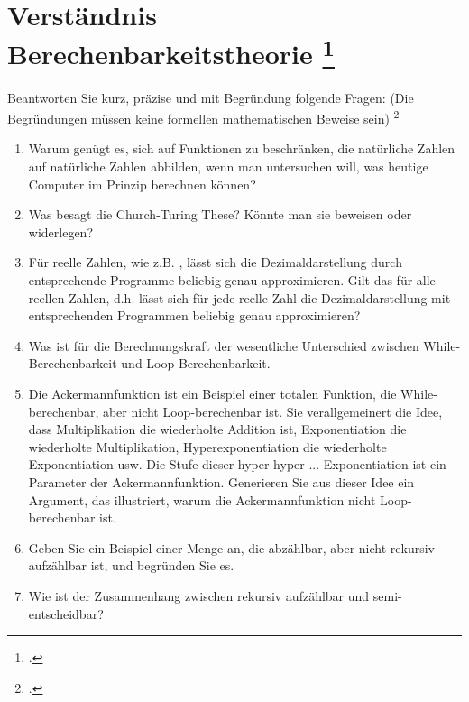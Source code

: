 \documentclass{lehramt-informatik-aufgabe}
\begin{document}
\section{Verständnis Berechenbarkeitstheorie
\footcite{66115:2016:03}}

Beantworten Sie kurz, präzise und mit Begründung folgende Fragen: (Die
Begründungen müssen keine formellen mathematischen Beweise sein)
\footcite[Aufgabe 9: F2016T2A2 (Check-Up)]{theo:ab:4}

\begin{enumerate}


\item Warum genügt es, sich auf Funktionen zu beschränken, die
natürliche Zahlen auf natürliche Zahlen abbilden, wenn man untersuchen
will, was heutige Computer im Prinzip berechnen können?


\item Was besagt die Church-Turing These? Könnte man sie beweisen oder
widerlegen?


\item Für reelle Zahlen, wie z.B. , lässt sich die Dezimaldarstellung
durch entsprechende Programme beliebig genau approximieren. Gilt das für
alle reellen Zahlen, d.h. lässt sich für jede reelle Zahl die
Dezimaldarstellung mit entsprechenden Programmen beliebig genau
approximieren?


\item Was ist für die Berechnungskraft der wesentliche Unterschied
zwischen While-Berechenbarkeit und Loop-Berechenbarkeit.


\item Die Ackermannfunktion ist ein Beispiel einer totalen Funktion, die
While-berechenbar, aber nicht Loop-berechenbar ist. Sie verallgemeinert
die Idee, dass Multiplikation die wiederholte Addition ist,
Exponentiation die wiederholte Multiplikation, Hyperexponentiation die
wiederholte Exponentiation usw. Die Stufe dieser hyper-hyper ...
Exponentiation ist ein Parameter der Ackermannfunktion. Generieren Sie
aus dieser Idee ein Argument, das illustriert, warum die
Ackermannfunktion nicht Loop-berechenbar ist.


\item Geben Sie ein Beispiel einer Menge an, die abzählbar, aber nicht
rekursiv aufzählbar ist, und begründen Sie es.


\item Wie ist der Zusammenhang zwischen rekursiv aufzählbar und
semi-entscheidbar?

\end{enumerate}
\end{document}
